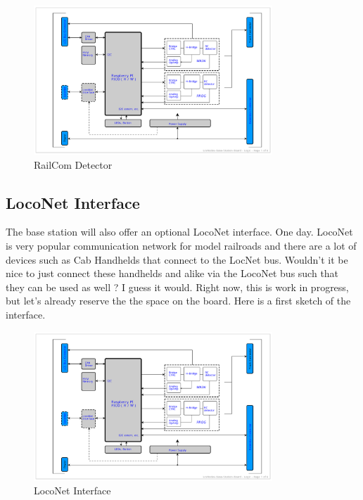 \begin{figure}[htbp]
    \centering
    \includegraphics[page=4, width=0.8\textwidth]{./Schematics/Schematic_LcsNodes-Base-Station-Board.pdf}
    \caption{RailCom Detector}
\end{figure}
\FloatBarrier

\subsection{LocoNet Interface}

The base station will also offer an optional LocoNet interface. One day. LocoNet is very popular communication network for model railroads and there are a lot of devices such as Cab Handhelds that connect to the LocNet bus. Wouldn't it be nice to just connect these handhelds and alike via the LocoNet bus such that they can be used as well ? I guess it would. Right now, this is work in progress, but let's already reserve the the space on the board. Here is a first sketch of the interface.

\begin{figure}[htbp]
    \centering
    \includegraphics[page=5, width=0.8\textwidth]{./Schematics/Schematic_LcsNodes-Base-Station-Board.pdf}
    \caption{LocoNet Interface}
\end{figure}
\FloatBarrier

